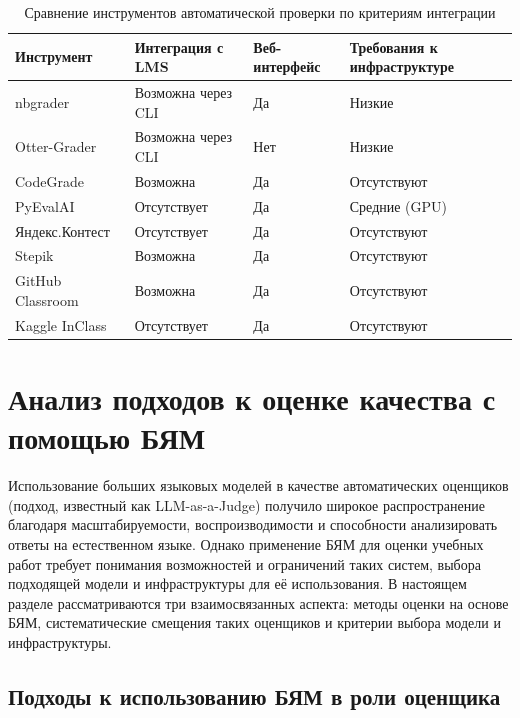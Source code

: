 \begin{table}[h!]
\LeftCaption
\caption{Сравнение инструментов автоматической проверки по критериям интеграции}
\label{tab:grading_tools_part2}
\centering
\begin{tabular}{|p{3.3cm}|p{3.4cm}|p{2.3cm}|p{3.6cm}|}
\hline
\textbf{Инструмент} & \textbf{Интеграция с LMS} &
\textbf{Веб-интерфейс} & \textbf{Требования к инфраструктуре}\\
\hline
nbgrader        & Возможна через CLI & Да  & Низкие \\
\hline
Otter-Grader    & Возможна через CLI & Нет & Низкие \\
\hline
CodeGrade       & Возможна           & Да  & Отсутствуют \\
\hline
PyEvalAI        & Отсутствует        & Да  & Средние (GPU) \\
\hline
Яндекс.Контест  & Отсутствует        & Да  & Отсутствуют \\
\hline
Stepik          & Возможна           & Да  & Отсутствуют \\
\hline
GitHub Classroom& Возможна           & Да  & Отсутствуют \\
\hline
Kaggle InClass  & Отсутствует        & Да  & Отсутствуют \\
\hline
\end{tabular}
\end{table}

\section{Анализ подходов к оценке качества с помощью БЯМ}\label{sec:llm_judge}

Использование больших языковых моделей в качестве автоматических оценщиков (подход, известный как LLM-as-a-Judge) получило широкое распространение благодаря масштабируемости, воспроизводимости и способности анализировать ответы на естественном языке. Однако применение БЯМ для оценки учебных работ требует понимания возможностей и ограничений таких систем, выбора подходящей модели и инфраструктуры для её использования. В настоящем разделе рассматриваются три взаимосвязанных аспекта: методы оценки на основе БЯМ, систематические смещения таких оценщиков и критерии выбора модели и инфраструктуры.

\subsection{Подходы к использованию БЯМ в роли оценщика}

